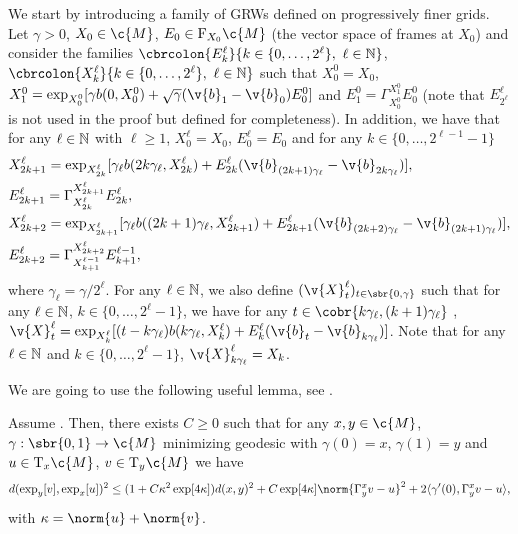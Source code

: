 We start by introducing a family of GRWs defined on progressively finer grids.
Let \(\gamma >0\), \(X_0 \in \c{M}\), \(E_0 \in \mathrm{F}_{X_0} \c{M}\) (the vector space of frames at \(X_0\)) and consider the families \(\cbrcolon{E_k^\ell}{k \in \{0, \dots, 2^\ell\}, \ \ell \in \N}\), \(\cbrcolon{X_k^\ell}{k \in \{0, \dots, 2^\ell\}, \ \ell \in \N}\) such that \(X_0^0 = X_0\), \(X_1^0 = \exp_{X_0^0}[\gamma b(0, X_0^0) + \sqrt{\gamma} (\v{b}_1 - \v{b}_0) E_0^0]\) and \(E_1^0 = \Gamma_{X_0^0}^{X_1^0} E_0^0\) (note that \(E_{2^\ell}^\ell\) is not used in the proof but defined for completeness).
In addition, we have that for any \(\ell \in \mathbb{N}\) with \(\ell \geq 1\), \(X_0^\ell = X_0\), \(E_0^\ell = E_0\) and for any \(k \in \{0, \dots, 2^{\ell-1}-1\}\) \begin{align} &X_{2k+1}^{\ell} = \exp_{X_{2k}^\ell}[\gamma_\ell b(2k \gamma_\ell, X_{2k}^\ell) + E_{2k}^\ell(\v{b}_{(2k+1)\gamma_\ell} - \v{b}_{2k \gamma_\ell}) ] , \\ &E_{2k+1}^\ell = \Gamma_{X_{2k}^\ell}^{X_{2k+1}^\ell} E_{2k}^\ell , \\ &X_{2k+2}^{\ell} = \exp_{X_{2k+1}^\ell}[\gamma_\ell b((2k+1) \gamma_\ell, X_{2k+1}^\ell) + E_{2k+1}^\ell (\v{b}_{(2k+2)\gamma_\ell} - \v{b}_{(2k+1) \gamma_\ell}) ] , \\ &E_{2k+2}^\ell = \Gamma_{X_{k+1}^{\ell-1}}^{X_{2k+2}^\ell} E_{k+1}^{\ell-1} , \label{eq:coupling} \end{align} where \(\gamma_\ell = \gamma / 2^\ell\).
For any \(\ell \in \mathbb{N}\), we also define \((\v{X}_t^\ell)_{t \in \sbr{0, \gamma}}\) such that for any \(\ell \in \mathbb{N}\), \(k \in \{0, \dots, 2^{\ell}-1\}\), we have for any \(t \in \cobr{k \gamma_\ell, (k+1) \gamma_\ell}\) , \(\v{X}_{t}^\ell = \exp_{X_{k}^\ell}[(t - k\gamma_\ell) b(k \gamma_\ell, X_{k}^\ell) + E_{k}^\ell (\v{b}_{t} - \v{b}_{k \gamma_\ell}) ]\).
Note that for any \(\ell \in \mathbb{N}\) and \(k \in \{0, \dots, 2^\ell -1\}\), \(\v{X}_{k \gamma_\ell}^\ell = X_k\).

We are going to use the following useful lemma, see \cite[Lemma 62]{cheng2022theorymanifold}.
\begin{lemma}
	\label{lemma:bound_exp}
	Assume .
	Then, there exists \(C \geq 0\) such that for any \(x, y \in \c{M}\), \(\gamma: \sbr{0,1} \to \c{M}\) minimizing geodesic with \(\gamma(0) = x\), \(\gamma(1) = y\) and \(u \in \mathrm{T}_x \c{M}\), \(v \in \mathrm{T}_y \c{M}\) we have \begin{equation} d(\exp_y[v], \exp_x[u])^2 \leq (1 +C \kappa^2 \exp[4 \kappa]) d(x,y)^2 + C \exp[4 \kappa] \norm{\Gamma_y^x v - u}^2 + 2 \langle \gamma'(0), \Gamma_y^x v - u \rangle , \end{equation} with \(\kappa = \norm{u} + \norm{v}\).
\end{lemma}

